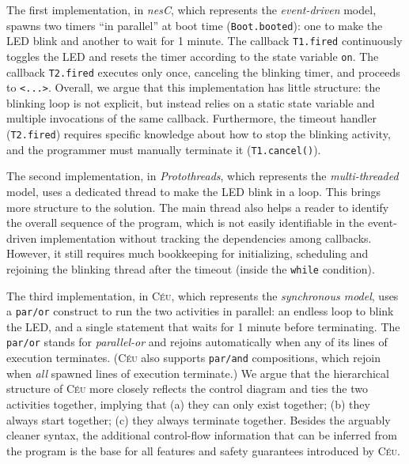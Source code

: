 \documentclass[letterpaper]{sig-alternate}
\newcommand{\code}[1] {{\small{\texttt{#1}}}}
\newcommand{\CEU}{\textsc{C\'{e}u}\xspace}
\begin{document}
The first implementation, in \emph{nesC}, which represents the 
\emph{event-driven} model, spawns two timers ``in parallel'' at boot time 
(\code{Boot.booted}): one to make the LED blink and another to wait for 1 
minute.
The callback \code{T1.fired} continuously toggles the LED and resets the timer 
according to the state variable \code{on}.
The callback \code{T2.fired} executes only once, canceling the blinking timer, 
and proceeds to \code{<...>}.
Overall, we argue that this implementation has little structure: the blinking 
loop is not explicit, but instead relies on a static state variable and 
multiple invocations of the same callback.
Furthermore, the timeout handler (\code{T2.fired}) requires specific knowledge 
about how to stop the blinking activity, and the programmer must manually 
terminate it (\code{T1.cancel()}).

The second implementation, in \emph{Protothreads}, which represents the 
\emph{multi-threaded} model, uses a dedicated thread to make the LED blink in a 
loop.
This brings more structure to the solution.
The main thread also helps a reader to identify the overall sequence of the 
program, which is not easily identifiable in the event-driven implementation 
without tracking the dependencies among callbacks.
However, it still requires much bookkeeping for initializing, scheduling and 
rejoining the blinking thread after the timeout (inside the \code{while} 
condition).


The third implementation, in \CEU, which represents the \emph{synchronous 
model}, uses a \code{par/or} construct to run the two activities in parallel:
an endless loop to blink the LED, and a single statement that waits for 1 
minute before terminating.
The \code{par/or} stands for \emph{parallel-or} and rejoins automatically when 
any of its lines of execution terminates.
(\CEU also supports \code{par/and} compositions, which rejoin when \emph{all} 
spawned lines of execution terminate.)
%
We argue that the hierarchical structure of \CEU more closely reflects the 
control diagram and ties the two activities together, implying that
(a) they can only exist together;
(b) they always start together;
(c) they always terminate together.
%
Besides the arguably cleaner syntax, the additional control-flow information 
that can be inferred from the program is the base for all features and safety 
guarantees introduced by \CEU.

\end{document}
